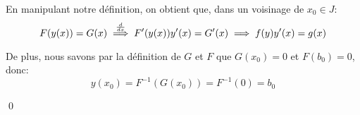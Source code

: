 \documentclass[a4paper]{article}
\begin{document}
{{        En manipulant notre définition, on obtient que, dans un voisinage de $x_0 \in J$:
        \[F\left(y\left(x\right)\right) = G\left(x\right) \over{\implies}{$\frac{d}{dx}$}  F'\left(y\left(x\right)\right) y'\left(x\right) = G'\left(x\right) \implies f\left(y\right)y'\left(x\right) =  g\left(x\right)\]

        De plus, nous savons par la définition de $G$ et $F$ que $G\left(x_0\right) = 0$ et $F\left(b_0\right) = 0$, donc:
        \[y\left(x_0\right) = F^{-1}\left(G\left(x_0\right)\right) = F^{-1}\left(0\right) = b_0\]

        \qed
    }

}
\end{document}
